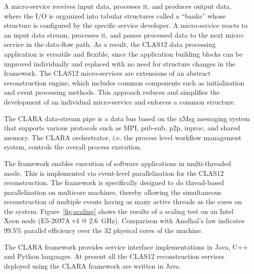 
A micro-service receives input data, processes it, and produces output data, where the I/O is organized into  tabular structures called a ``banks''
whose structure is configured by the specific service developer.  A micro-service reacts to an input data stream,
processes it, and passes processed data to the next micro-service in the data-flow path.  As a result, the CLAS12
data processing application is versatile and flexible, since the application building blocks can be improved individually
and replaced with no need for structure changes in the framework. The CLAS12 micro-services are extensions of an
abstract reconstruction engine, which includes common components such as initialization and event processing
methods. This approach reduces and simplifies the development of an individual micro-service and enforces a common
structure. 

The CLARA data-stream pipe is a data bus based on the xMsg messaging system that supports various protocols
such as MPI, pub-sub, p2p, inproc, and shared memory. The CLARA orchestrator, i.e. the process level workflow
management system, controls the overall process execution. 

The framework enables execution of software applications in multi-threaded mode. This is implemented via event-level
parallelization for the CLAS12 reconstruction. 
The framework is specifically designed to do thread-based
parallelization on multicore machines, thereby allowing 
the simultaneous reconstruction of multiple events having as many active threads as the cores
on the system.  
Figure~\ref{fig:scaling} shows the results of a scaling test on an
Intel Xeon node (E5-2697A v4 @ 2.6~GHz). Comparison with Amdhal's law indicates 99.5\% parallel efficiency over
the 32 physical cores of the machine.

The CLARA framework provides service interface implementations in Java, C++ and Python languages. 
At present all the CLAS12 reconstruction services deployed using the CLARA framework are written in Java.

